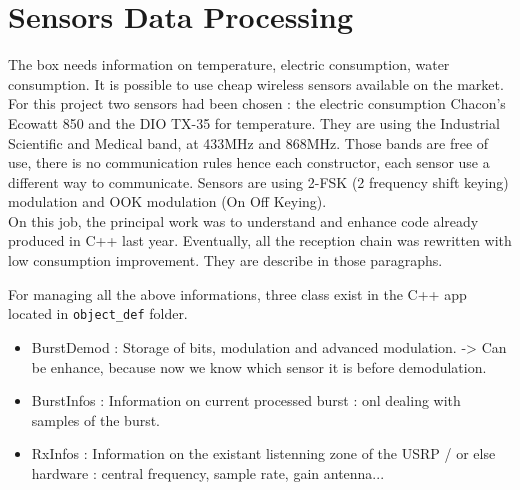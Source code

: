 %
%
\section{Sensors Data Processing}
The box needs information on temperature, electric consumption, water consumption. It is possible to use cheap wireless sensors available on the market. For this project two sensors had been chosen : the electric consumption Chacon's Ecowatt 850 and the DIO TX-35 for temperature. They are using the Industrial Scientific and Medical band, at 433MHz and 868MHz. Those bands are free of use, there is no communication rules hence each constructor, each sensor use a different way to communicate. Sensors are using 2-FSK (2 frequency shift keying) modulation and OOK modulation (On Off Keying). \\
On this job, the principal work was to understand and enhance code already produced in \textsc{C++} last year. Eventually, all the reception chain was rewritten with low consumption improvement. They are describe in those paragraphs.

For managing all the above informations, three class exist in the C++ app located in \texttt{object\_def} folder.
\begin{itemize}
\item BurstDemod : Storage of bits, modulation and advanced modulation. -> Can be enhance, because now we know which sensor it is before demodulation.
\item BurstInfos : Information on current processed burst : onl dealing with samples of the burst.
\item RxInfos : Information on the existant listenning zone of the USRP / or else hardware : central frequency, sample rate, gain antenna...
\end{itemize}

